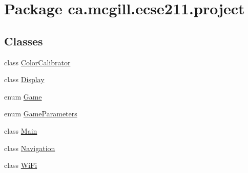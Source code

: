 \hypertarget{namespaceca_1_1mcgill_1_1ecse211_1_1project}{}\section{Package ca.\+mcgill.\+ecse211.\+project}
\label{namespaceca_1_1mcgill_1_1ecse211_1_1project}
\subsection*{Classes}
\begin{DoxyCompactItemize}
\item 
class \hyperlink{classca_1_1mcgill_1_1ecse211_1_1project_1_1_color_calibrator}{Color\+Calibrator}
\item 
class \hyperlink{classca_1_1mcgill_1_1ecse211_1_1project_1_1_display}{Display}
\item 
enum \hyperlink{enumca_1_1mcgill_1_1ecse211_1_1project_1_1_game}{Game}
\item 
enum \hyperlink{enumca_1_1mcgill_1_1ecse211_1_1project_1_1_game_parameters}{Game\+Parameters}
\item 
class \hyperlink{classca_1_1mcgill_1_1ecse211_1_1project_1_1_main}{Main}
\item 
class \hyperlink{classca_1_1mcgill_1_1ecse211_1_1project_1_1_navigation}{Navigation}
\item 
class \hyperlink{classca_1_1mcgill_1_1ecse211_1_1project_1_1_wi_fi}{Wi\+Fi}
\end{DoxyCompactItemize}

